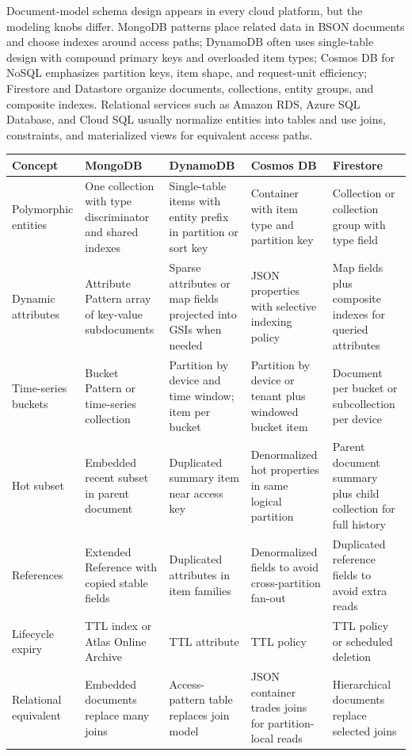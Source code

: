 \begin{crosscloud}
Document-model schema design appears in every cloud platform, but the modeling knobs differ. MongoDB patterns place related data in BSON documents and choose indexes around access paths; DynamoDB often uses single-table design with compound primary keys and overloaded item types; Cosmos DB for NoSQL emphasizes partition keys, item shape, and request-unit efficiency; Firestore and Datastore organize documents, collections, entity groups, and composite indexes. Relational services such as Amazon RDS, Azure SQL Database, and Cloud SQL usually normalize entities into tables and use joins, constraints, and materialized views for equivalent access paths.

\vspace{2mm}
{\footnotesize
\begin{tabular}{@{}p{2.7cm}p{3.0cm}p{3.0cm}p{3.0cm}p{3.0cm}@{}}
\toprule
\textbf{Concept} & \textbf{MongoDB} & \textbf{DynamoDB} & \textbf{Cosmos DB} & \textbf{Firestore} \\
\midrule
Polymorphic entities & One collection with type discriminator and shared indexes & Single-table items with entity prefix in partition or sort key & Container with item type and partition key & Collection or collection group with type field \\
Dynamic attributes & Attribute Pattern array of key-value subdocuments & Sparse attributes or map fields projected into GSIs when needed & JSON properties with selective indexing policy & Map fields plus composite indexes for queried attributes \\
Time-series buckets & Bucket Pattern or time-series collection & Partition by device and time window; item per bucket & Partition by device or tenant plus windowed bucket item & Document per bucket or subcollection per device \\
Hot subset & Embedded recent subset in parent document & Duplicated summary item near access key & Denormalized hot properties in same logical partition & Parent document summary plus child collection for full history \\
References & Extended Reference with copied stable fields & Duplicated attributes in item families & Denormalized fields to avoid cross-partition fan-out & Duplicated reference fields to avoid extra reads \\
Lifecycle expiry & TTL index or Atlas Online Archive & TTL attribute & TTL policy & TTL policy or scheduled deletion \\
Relational equivalent & Embedded documents replace many joins & Access-pattern table replaces join model & JSON container trades joins for partition-local reads & Hierarchical documents replace selected joins \\
\bottomrule
\end{tabular}}


\end{crosscloud}

